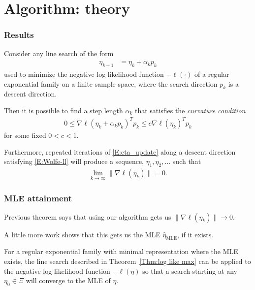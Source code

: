 \documentclass[ 10pt]{beamer}
\newcommand{\etaMLE}{\hat{\eta}_{\textrm{MLE}}}
\begin{document}
\section{Algorithm: theory}

\frame
{
\frametitle{Results}
{\small
\begin{theorem} \label{Thm:log like max}
Consider any line search of the form 
\begin{align}
	\eta_{k+1} &= \eta_k + \alpha_k p_k \label{E:eta_update}
\end{align}
used to minimize the negative log likelihood function $-\ell(\cdot)$ of a regular 
exponential family on a finite sample space, where the search direction $p_k$ 
is a descent direction.

Then it is possible to find a step length $\alpha_k$ 
that satisfies the \emph{curvature condition}
\begin{align}
	0 \leq \nabla \ell( \eta_k + \alpha_k p_k)^T p_k  \leq c \nabla \ell(\eta_k)^T p_k  
\label{E:Wolfe-ll}
\end{align}
for some fixed $0 < c < 1$.

Furthermore, repeated iterations of \eqref{E:eta_update} along a descent direction 
satisfying \eqref{E:Wolfe-ll} will produce a sequence, $\eta_1, \eta_2, \ldots$ such 
that
\begin{align*}
	\lim_{k \to \infty} \lVert \nabla \ell(\eta_k) \rVert = 0.
\end{align*}
\end{theorem}
}
}

\frame
{
\frametitle{MLE attainment}
Previous theorem says that using our algorithm gets us 
$\lVert \nabla \ell(\eta_k) \rVert \to 0$.  

A little more work shows that this gets us the MLE $\etaMLE$, if it exists.

\begin{theorem} \label{Thm:Line Search works}
For a regular exponential family with minimal representation where the MLE exists, the 
line search described in 
Theorem~\ref{Thm:log like max} can be applied to the negative log likelihood function 
$-\ell(\eta)$ so that a search 
starting at any $\eta_0 \in \Xi$ will converge to the MLE of $\eta$.
\end{theorem}

}
\end{document}
